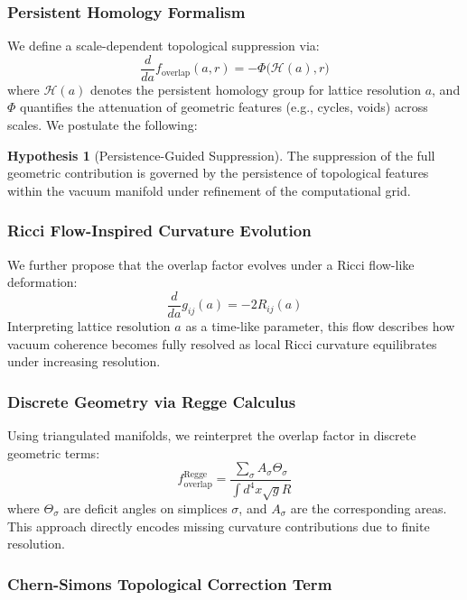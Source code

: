 ﻿\documentclass[12pt]{article}
\theoremstyle{definition}
\newtheorem{hypothesis}{Hypothesis}
\theoremstyle{plain}
\begin{document}
\subsubsection*{Persistent Homology Formalism}

We define a scale-dependent topological suppression via:
\[
\frac{d}{da} f_{\mathrm{overlap}}(a, r) = -\Phi\big(\mathcal{H}(a), r\big)
\]
where \(\mathcal{H}(a)\) denotes the persistent homology group for lattice resolution \(a\), and \(\Phi\) quantifies the attenuation of geometric features (e.g., cycles, voids) across scales. We postulate the following:

\begin{hypothesis}[Persistence-Guided Suppression]
The suppression of the full geometric contribution is governed by the persistence of topological features within the vacuum manifold under refinement of the computational grid.
\end{hypothesis}

\subsubsection*{Ricci Flow-Inspired Curvature Evolution}

We further propose that the overlap factor evolves under a Ricci flow-like deformation:
\[
\frac{d}{da} g_{ij}(a) = -2 R_{ij}(a)
\]
Interpreting lattice resolution \(a\) as a time-like parameter, this flow describes how vacuum coherence becomes fully resolved as local Ricci curvature equilibrates under increasing resolution.

\subsubsection*{Discrete Geometry via Regge Calculus}

Using triangulated manifolds, we reinterpret the overlap factor in discrete geometric terms:
\[
f_{\mathrm{overlap}}^{\text{Regge}} = \frac{\sum_{\sigma} A_\sigma \Theta_\sigma}{\int d^4x \sqrt{g} R}
\]
where \(\Theta_\sigma\) are deficit angles on simplices \(\sigma\), and \(A_\sigma\) are the corresponding areas. This approach directly encodes missing curvature contributions due to finite resolution.

\subsubsection*{Chern-Simons Topological Correction Term}
\end{document}
